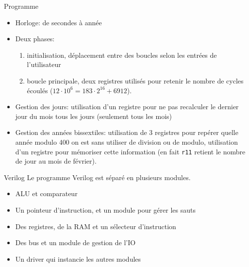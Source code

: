 \documentclass{beamer}
\begin{document}
\begin{frame}[fragile]{Programme}
  \begin{itemize}
  \item Horloge: de secondes à année
    \pause
  \item Deux phases:
    \begin{enumerate}
    \item initialisation, déplacement entre des boucles selon les
      entrées de l'utilisateur
    \item boucle principale, deux registres utilisés pour retenir le
      nombre de cycles écoulés ($12 \cdot 10^6 = 183 \cdot 2^{16} + 6912$).
      \pause
    \end{enumerate}

  \item Gestion des jours: utilisation d'un registre pour ne pas
    recalculer le dernier jour du mois tous les jours (seulement tous
    les mois)
    \pause
  \item Gestion des années bissextiles: utilisation de 3 registres
    pour repérer quelle année modulo 400 on est sans utiliser de
    division ou de modulo, utilisation d'un registre pour mémoriser
    cette information (en fait \verb+r11+ retient le nombre de jour au
    mois de février).
  \end{itemize}
\end{frame}

\begin{frame}{Verilog}
  Le programme Verilog est séparé en plusieurs modules.
  \pause
  \begin{itemize}
  \item ALU et comparateur
    \pause
  \item Un pointeur d'instruction, et un module pour gérer les sauts
    \pause
  \item Des registres, de la RAM et un sélecteur d'instruction
    \pause
  \item Des bus et un module de gestion de l'IO
    \pause
  \item Un driver qui instancie les autres modules
  \end{itemize}
\end{frame}
\end{document}
